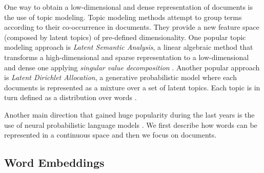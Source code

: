 


One way to obtain a low-dimensional and dense representation of documents is the use of topic modeling. Topic modeling methods attempt to group terms according to their co-occurrence in documents. They provide a new feature space (composed by latent topics) of pre-defined dimensionality. One popular topic modeling approach is \textit{Latent Semantic Analysis}, a linear algebraic method that transforms a high-dimensional and sparse representation to a low-dimensional and dense one applying \textit{singular value decomposition} . Another popular approach is \textit{Latent Dirichlet Allocation}, a generative probabilistic model where each documents is represented as a mixture over a set of latent topics. Each topic is in turn defined as a distribution over words .

Another main direction that gained huge popularity during the last years is the use of neural probabilistic language models \parencite{bengio2003neural}. We first describe how words can be represented in a continuous space and then we focus on documents.

\subsection{Word Embeddings}

